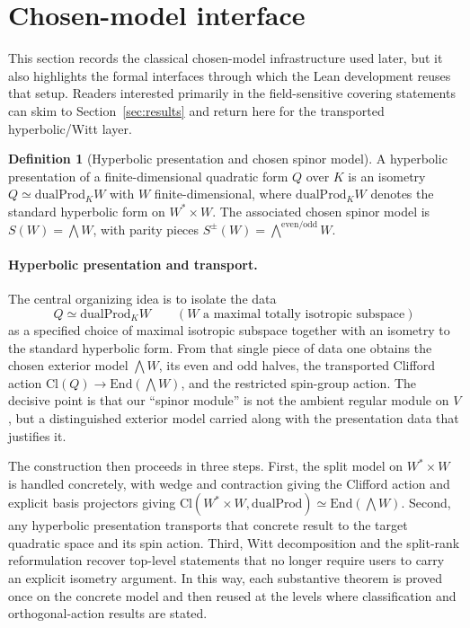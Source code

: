 \documentclass[11pt,a4paper]{article}
\theoremstyle{plain}
\theoremstyle{definition}
\newtheorem{definition}[theorem]{Definition}
\theoremstyle{remark}
\newcommand{\Cl}{\mathrm{Cl}}
\newcommand{\End}{\mathrm{End}}
\newcommand{\dualProd}{\mathrm{dualProd}}
\begin{document}
\section{Chosen-model interface}
\label{sec:arch}

This section records the classical chosen-model infrastructure used later, but
it also highlights the formal interfaces through which the Lean development
reuses that setup. Readers interested primarily in the field-sensitive covering
statements can skim to Section~\ref{sec:results} and return here for the
transported hyperbolic/Witt layer.

\begin{definition}[Hyperbolic presentation and chosen spinor model]
A hyperbolic presentation of a finite-dimensional quadratic form $Q$ over $K$
is an isometry $Q \simeq \dualProd_K W$ with $W$ finite-dimensional, where
$\dualProd_K W$ denotes the standard hyperbolic form on $W^* \times W$. The
associated chosen spinor model is $S(W)=\bigwedge W$, with parity pieces
$S^\pm(W)=\bigwedge^{\mathrm{even}/\mathrm{odd}} W$.
\end{definition}

\paragraph{Hyperbolic presentation and transport.} The central organizing idea is
to isolate the data
\[
  Q \simeq \dualProd_K W
  \qquad (W \text{ a maximal totally isotropic subspace})
\]
as a specified choice of maximal isotropic subspace together with an isometry to
the standard hyperbolic form. From that single piece of data one obtains the
chosen exterior model $\bigwedge W$, its even and odd halves, the transported
Clifford action $\Cl(Q)\to\End(\bigwedge W)$, and the restricted spin-group
action. The decisive point is that our ``spinor module'' is not the
ambient regular module on $V$, but a distinguished exterior model carried along
with the presentation data that justifies it.

The construction then proceeds in three steps. First, the split model on
$W^* \times W$ is handled concretely, with wedge and contraction giving the
Clifford action and explicit basis projectors giving
$\Cl(W^* \times W,\dualProd)\simeq\End(\bigwedge W)$. Second, any hyperbolic
presentation transports that concrete result to the target quadratic space and
its spin action. Third, Witt decomposition and the split-rank reformulation recover
top-level statements that no longer require users to carry an explicit isometry
argument. In this way, each substantive theorem is proved once on the concrete
model and then reused at the levels where classification and orthogonal-action
results are stated.
\end{document}
